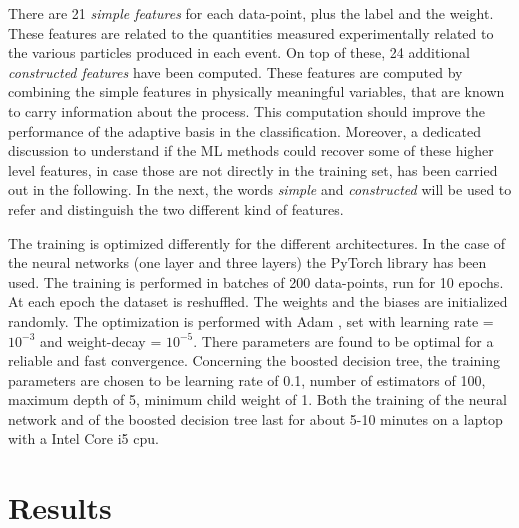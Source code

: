 \documentclass{article}
\begin{document}
There are 21 \textit{simple features} for each data-point, plus the label and the weight.
These features are related to the quantities measured experimentally related to the various particles produced in each event.
On top of these, 24 additional \textit{constructed features} have been computed. These features are computed by combining the simple features in physically meaningful variables, that are known to carry information about the process. This computation should improve the performance of the adaptive basis in the classification. Moreover, a dedicated discussion to understand if the ML methods could recover some of these higher level features, in case those are not directly in the training set, has been carried out in the following. In the next, the words \textit{simple} and \textit{constructed} will be used to refer and distinguish the two different kind of features.

The training is optimized differently for the different architectures. In the case of the neural networks (one layer and three layers) the PyTorch library has been used.
The training is performed in batches of 200 data-points, run for 10 epochs. At each epoch the dataset is reshuffled. The weights and the biases are initialized randomly. The optimization is performed with Adam \cite{adam}, set with learning rate = $10^{-3}$ and weight-decay = $10^{-5}$. There parameters are found to be optimal for a reliable and fast convergence.
Concerning the boosted decision tree, the training parameters are chosen to be learning rate of 0.1, number of estimators of 100, maximum depth of 5, minimum child weight of 1.
Both the training of the neural network and of the boosted decision tree last for about 5-10 minutes on a laptop with a Intel Core i5 cpu.


\section{Results}
\end{document}
